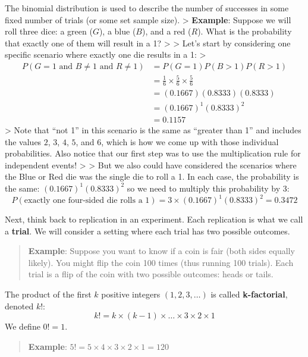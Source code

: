 \documentclass[
]{book}
\begin{document}
The binomial distribution is used to describe the number of successes in some fixed number of trials (or some set sample size).
\textgreater{} \textbf{Example}: Suppose we will roll three dice: a green (\(G\)), a blue (\(B\)), and a red (\(R\)). What is the probability that exactly one of them will result in a 1?
\textgreater{}
\textgreater{} Let's start by considering one specific scenario where exactly one die results in a 1:
\textgreater{} \[\begin{aligned} 
P(G = 1 \text{ and } B \ne 1 \text{ and } R \ne 1 ) &= P(G = 1)P(B > 1)P(R > 1) \\
&= \frac{1}{6} \times \frac{5}{6} \times \frac{5}{6} \\
&= (0.1667)(0.8333)(0.8333) \\
&= (0.1667)^1(0.8333)^2 \\
&= 0.1157
\end{aligned} \]
\textgreater{} Note that ``not 1'' in this scenario is the same as ``greater than 1'' and includes the values \(2\), \(3\), \(4\), \(5\), and \(6\), which is how we come up with those individual probabilities. Also notice that our first step was to use the multiplication rule for independent events!
\textgreater{}
\textgreater{} But we also could have considered the scenarios where the Blue or Red die was the single die to roll a 1. In each case, the probability is the same: \((0.1667)^1(0.8333)^2\) so we need to multiply this probability by 3: \[P(\text{exactly one four-sided die rolls a 1}) = 3\times(0.1667)^1(0.8333)^2 = 0.3472\]

Next, think back to replication in an experiment. Each replication is what we call a \textbf{trial}. We will consider a setting where each trial has two possible outcomes.

\begin{quote}
\textbf{Example}: Suppose you want to know if a coin is fair (both sides equally likely). You might flip the coin 100 times (thus running 100 trials). Each trial is a flip of the coin with two possible outcomes: heads or tails.
\end{quote}

The product of the first \(k\) positive integers \((1, 2, 3, \dots)\) is called \textbf{k-factorial}, denoted \(k!\): \[k! = k \times (k-1) \times\dots\times 3 \times 2 \times 1\] We define \(0!=1\).

\begin{quote}
\textbf{Example}: \(5! = 5 \times 4 \times 3 \times 2 \times 1 = 120\)
\end{quote}
\end{document}
